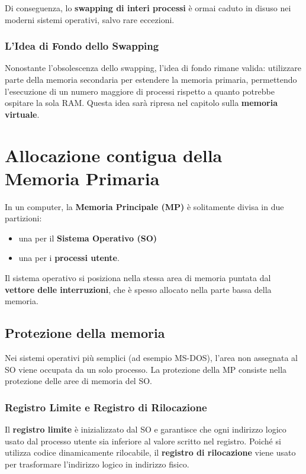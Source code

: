 Di conseguenza, lo \textbf{swapping di interi processi} è ormai caduto in disuso nei moderni sistemi operativi, salvo rare eccezioni.

\subsubsection*{L'Idea di Fondo dello Swapping}

Nonostante l'obsolescenza dello swapping, l'idea di fondo rimane valida: utilizzare parte della memoria secondaria per estendere la memoria primaria, permettendo l'esecuzione di un numero maggiore di processi rispetto a quanto potrebbe ospitare la sola RAM. Questa idea sarà ripresa nel capitolo sulla \textbf{memoria virtuale}.


\section{Allocazione contigua della Memoria Primaria}
In un computer, la \textbf{Memoria Principale (MP)} è solitamente divisa in due partizioni:
\begin{itemize}
    \item una per il \textbf{Sistema Operativo (SO)}
    \item una per i \textbf{processi utente}.
\end{itemize}

Il sistema operativo si posiziona nella stessa area di memoria puntata dal \textbf{vettore delle interruzioni}, che è spesso allocato nella parte bassa della memoria.

\subsection*{Protezione della memoria}

Nei sistemi operativi più semplici (ad esempio MS-DOS), l'area non assegnata al SO viene occupata da un solo processo. La protezione della MP consiste nella protezione delle aree di memoria del SO.

\subsubsection*{Registro Limite e Registro di Rilocazione}

Il \textbf{registro limite} è inizializzato dal SO e garantisce che ogni indirizzo logico usato dal processo utente sia inferiore al valore scritto nel registro. Poiché si utilizza codice dinamicamente rilocabile, il \textbf{registro di rilocazione} viene usato per trasformare l'indirizzo logico in indirizzo fisico.

